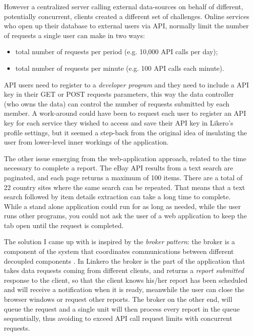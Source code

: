 However a centralized server calling external data-sources on behalf of
different, potentially concurrent, clients created a different set of
challenges. Online services who open up their database to external users via
API, normally limit the number of requests a single user can make in two ways:
\begin{itemize}
  \item total number of requests per period (e.g. 10,000 API calls per day);
  \item total number of requests per minute (e.g. 100 API calls each minute).
\end{itemize}

API users need to register to a \emph{developer program} and they need to
include a API key in their GET or POST requests parameters, this way the data
controller (who owns the data) can control the number of requests submitted by
each member. A work-around could have been to request each user to register an
API key for each service they wished to access and save their API key in
Likero's profile settings, but it seemed a step-back from the original idea of
insulating the user from lower-level inner workings of the application.

The other issue emerging from the web-application approach, related to the time
necessary to complete a report. The eBay API results from a text search are
paginated, and each page returns a maximum of 100 items. There are a total of 22
country sites where the same search can be repeated. That means that a text
search followed by item details extraction can take a long time to complete.
While a stand alone application could run for as long as needed, while the user
runs other programs, you could not ask the user of a web application to keep the
tab open until the request is completed.

The solution I came up with is inspired by the \emph{broker pattern}: the broker
is a component of the system that coordinates communications between different
decoupled components \cite{}. In Linkero the broker is the part of the
application that takes data requests coming from different clients, and returns
a \emph{report submitted} response to the client, so that the client knows
his/her report has been scheduled and will receive a notification when it is
ready, meanwhile the user can close the browser windows or request other
reports. The broker on the other end, will queue the request and a single unit
will then process every report in the queue sequentially, thus avoiding to
exceed API call request limits with concurrent requests.

